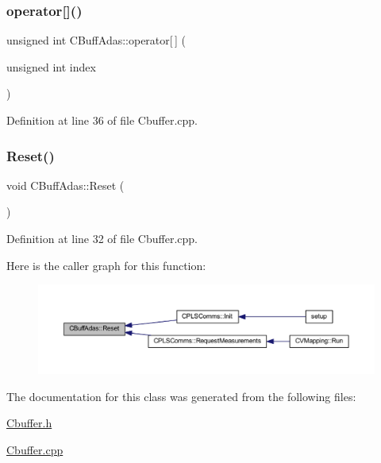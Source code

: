 \subsubsection{\texorpdfstring{operator[]()}{operator[]()}}
{\footnotesize\ttfamily unsigned int C\+Buff\+Adas\+::operator\mbox{[}$\,$\mbox{]} (\begin{DoxyParamCaption}\item[{unsigned int}]{index }\end{DoxyParamCaption})}



Definition at line 36 of file Cbuffer.\+cpp.

\mbox{\label{class_c_buff_adas_a2ff1ee5f1dfa56117d76b17027d7b7e8}} 
\subsubsection{\texorpdfstring{Reset()}{Reset()}}
{\footnotesize\ttfamily void C\+Buff\+Adas\+::\+Reset (\begin{DoxyParamCaption}{ }\end{DoxyParamCaption})}



Definition at line 32 of file Cbuffer.\+cpp.

Here is the caller graph for this function\+:\nopagebreak
\begin{figure}[H]
\begin{center}
\leavevmode
\includegraphics[width=350pt]{class_c_buff_adas_a2ff1ee5f1dfa56117d76b17027d7b7e8_icgraph}
\end{center}
\end{figure}


The documentation for this class was generated from the following files\+:\begin{DoxyCompactItemize}
\item 
\mbox{\hyperlink{_cbuffer_8h}{Cbuffer.\+h}}\item 
\mbox{\hyperlink{_cbuffer_8cpp}{Cbuffer.\+cpp}}\end{DoxyCompactItemize}
